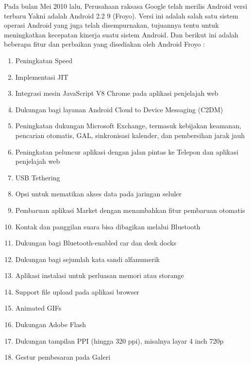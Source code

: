 \begin{enumerate}
Pada bulan Mei 2010 lalu, Perusahaan raksasa Google telah merilis Android versi terbaru Yakni adalah Android 2.2 9 (Froyo). Versi ini adalah salah satu sistem operasi Android yang juga telah disempurnakan, tujuannya tentu untuk meningkatkan kecepatan kinerja suatu sistem Android. Dan berikut ini adalah beberapa fitur dan perbaikan yang disediakan oleh Android Froyo :
\begin{enumerate}
    \item Peningkatan Speed
    \item Implementasi JIT
    \item Integrasi mesin JavaScript V8 Chrome pada aplikasi penjelajah web
    \item Dukungan bagi layanan Android Cloud to Device Messaging (C2DM)
    \item Peningkatan dukungan Microsoft Exchange, termasuk kebijakan keamanan, pencarian otomatis, GAL, sinkronisasi kalender, dan pembersihan jarak jauh
    \item Peningkatan peluncur aplikasi dengan jalan pintas ke Telepon dan aplikasi penjelajah web
    \item USB Tethering
    \item Opsi untuk mematikan akses data pada jaringan seluler
    \item Pembaruan aplikasi Market dengan menambahkan fitur pembaruan otomatis
    \item Kontak dan panggilan suara bisa dibagikan melalui Bluetooth
    \item Dukungan bagi Bluetooth-enabled car dan desk docks
    \item Dukungan bagi sejumlah kata sandi alfanumerik
    \item Aplikasi instalasi untuk perluasan memori atau storange
    \item Support file upload pada aplikasi browser
    \item Animated GIFs
    \item Dukungan Adobe Flash
    \item Dukungan tampilan PPI (hingga 320 ppi), misalnya layar 4 inch 720p
    \item Gestur pembesaran pada Galeri
\end{enumerate}


\end{enumerate}
